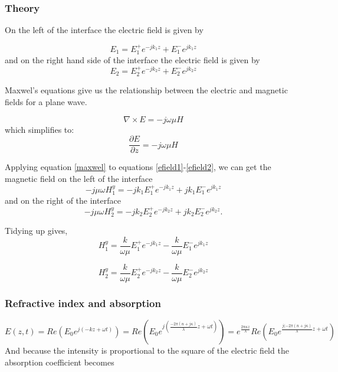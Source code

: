 \subsubsection{Theory}
On the left of the interface the electric field is given by

\begin{equation}
E_{1}=E^{+}_{1} e^{-j k_1 z}+E^{-}_{1} e^{j k_1 z}
\label{efield1}
\end{equation}
and on the right hand side of the interface the electric field is given by
\begin{equation}
E_{2}=E^{+}_{2} e^{-j k_2 z}+E^{-}_{2} e^{j k_2 z}
\label{efield2}
\end{equation}

Maxwel's equations give us the relationship between the electric and magnetic fields for a plane wave.

\begin{equation}
\nabla \times E=-j\omega \mu H 
\end{equation}
which simplifies to:
\begin{equation}
\frac{\partial E} {\partial z}=-j\omega \mu H 
\label{maxwel}
\end{equation}

Applying equation \ref{maxwel} to equations \ref{efield1}-\ref{efield2}, we can get the magnetic field on the left of the interface
\begin{equation}
-j \mu \omega H^{y}_{1}=-j k_1 E^{+}_{1} e^{-j k_1 z}+j k_1 E^{-}_{1} e^{j k_1 z}
\end{equation}
and on the right of the interface
\begin{equation}
-j \mu \omega H^{y}_{2}=-j k_2 E^{+}_{2} e^{-j k_2 z}+j k_2 E^{-}_{2} e^{j k_2 z}.
\end{equation}

Tidying up gives,
\begin{equation}
H^{y}_{1}=\frac{k}{\omega \mu}E^{+}_{1} e^{-j k_1 z}-\frac{k}{\omega \mu} E^{-}_{1} e^{j k_1 z}
\end{equation}

\begin{equation}
H^{y}_{2}=\frac{k}{\omega \mu}E^{+}_{2} e^{-j k_2 z}-\frac{k}{\omega \mu} E^{-}_{2} e^{j k_2 z}
\end{equation}


\subsubsection{Refractive index and absorption}
\begin{equation}
E(z,t)=Re(E_0 e^{j(-kz+\omega t)})= Re(E_0 e^{j(\frac{-2 \pi (n+j\kappa)}{\lambda}z + \omega t)})=e^{\frac{2\pi\kappa z}{\lambda}}Re(E_0 e^{\frac{j(-2 \pi (n+j\kappa)}{\lambda}z +\omega t})
\end{equation}
And because the intensity is proportional to the square of the electric field the absorption coefficient becomes

